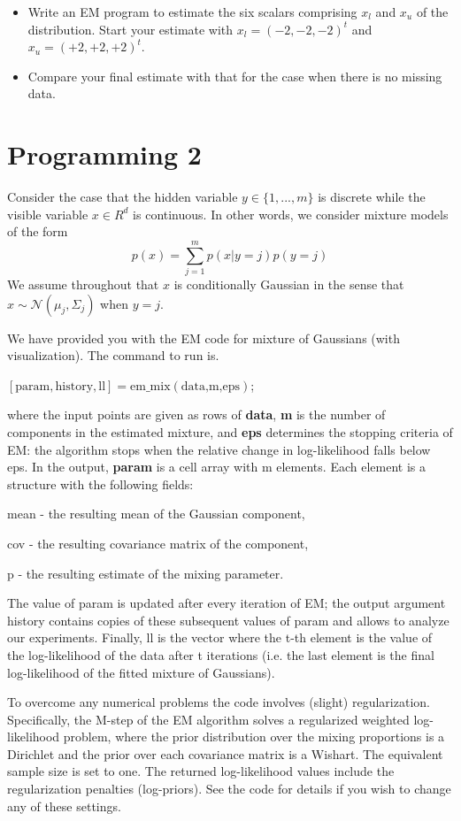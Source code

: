 \documentclass{article}
\theoremstyle{definition}
\theoremstyle{definition}
\theoremstyle{remark}
\begin{document}
\begin{itemize}
  \item Write an EM program to estimate the six scalars comprising $x_l$ and $x_u$ of the distribution.
Start your estimate with $x_l = (-2, -2, -2)^t$ and $x_u = (+2, +2, +2)^t$.
  \item Compare your final estimate with that for the case when there is no missing data.
\end{itemize}

\section*{Programming 2}
Consider the case that the hidden variable $y \in \{1, ..., m\}$ is discrete while the visible variable $x \in R^d$
is continuous. In other words, we consider mixture models of the form
\begin{equation}
  p(x) = \sum_{j = 1}^m p(x|y = j)p(y=j)
\end{equation}
We assume throughout that $x$ is conditionally Gaussian in the sense that $x \sim \mathcal{N}(\mu_j
, \Sigma_j)$ when $y = j$.

We have provided you with the EM code for mixture of Gaussians (with visualization).
The command to run is.

$[\text{param},\text{history},\text{ll}] = \text{em}\_\text{mix}(\text{data,m,eps})$;

where the input points are given as rows of \textbf{data}, \textbf{m} is the number of components in the
estimated mixture, and \textbf{eps} determines the stopping criteria of EM: the algorithm stops
when the relative change in log-likelihood falls below eps. In the output, \textbf{param} is a cell
array with m elements. Each element is a structure with the following fields:

mean - the resulting mean of the Gaussian component,

cov - the resulting covariance matrix of the component,

p - the resulting estimate of the mixing parameter.

The value of param is updated after every iteration of EM; the output argument history
contains copies of these subsequent values of param and allows to analyze our experiments.
Finally, ll is the vector where the t-th element is the value of the log-likelihood of the data
after t iterations (i.e. the last element is the final log-likelihood of the fitted mixture of
Gaussians).

To overcome any numerical problems the code involves (slight) regularization. Specifically,
the M-step of the EM algorithm solves a regularized weighted log-likelihood problem, where
the prior distribution over the mixing proportions is a Dirichlet and the prior over each
covariance matrix is a Wishart. The equivalent sample size is set to one. The returned log-likelihood
values include the regularization penalties (log-priors). See the code for details
if you wish to change any of these settings.
\end{document}
